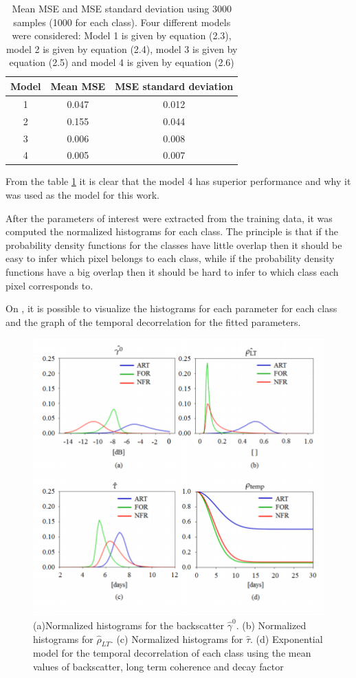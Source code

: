 \begin{table}[H]
    \centering
    \begin{tabular}{c|c|c}
    \hline
     Model&Mean MSE& MSE standard deviation  \\
     \hline
     1&0.047&0.012\\
     2&0.155&0.044\\
     3&0.006&0.008\\
     4&0.005&0.007\\
     \hline
    \end{tabular}
\caption{Mean MSE and MSE standard deviation using 3000 samples (1000 for each class). Four different models were considered: Model 1 is given by equation (2.3), model 2 is given by equation (2.4), model 3 is given by equation (2.5) and model 4 is given by equation (2.6) }
\label{tabelamse}
\end{table}

From the table \ref{tabelamse} it is clear that the model 4 has superior performance and why it was used as the model for this work.

After the parameters of interest were extracted from the training data, it was computed the normalized histograms for each class. The principle is that if the probability density functions for the classes have little overlap then it should be easy to infer which pixel belongs to each class, while if the probability density functions have a big overlap then it should be hard to infer to which class each pixel corresponds to. 

On , it is possible to visualize the histograms for each parameter for each class and the graph of the temporal decorrelation for the fitted parameters.

\begin{figure}[H]
    \centering
    \includegraphics{Cap4/histogramas.png}
    \caption{(a)Normalized histograms for the backscatter $\hat{\gamma}^0$. (b) Normalized histograms for $\hat{\rho}_{LT}$. (c) Normalized histograms for $\hat{\tau}$. (d) Exponential model for the temporal decorrelation of each class using the mean values of backscatter, long term coherence and decay factor }
    \label{fig:normalized_histograms}
\end{figure}

